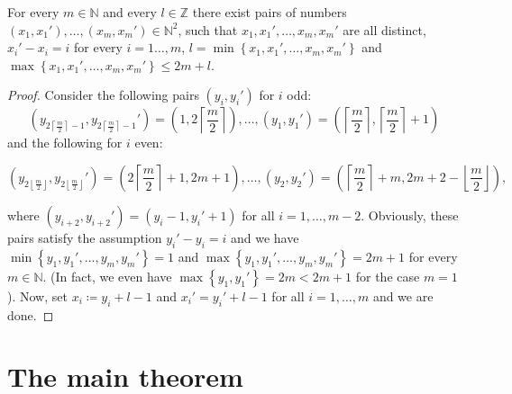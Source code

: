 \begin{lem}\label{lemma15}
For every \(m\in\mathbb{N}\) and every \(l\in\mathbb{Z}\) there exist pairs of numbers\\
\((x_1,x_1'),\ldots,(x_m,x_m')\in\mathbb{N}^2\), such that \(x_1,x_1',\ldots,x_m,x_m'\) are all distinct,\\
\(x_i'-x_i=i\) for every \(i=1\ldots,m\), \(l=\min\left\{x_1,x_1',\ldots,x_m,x_m'\right\}\) and\\
\(\max\left\{x_1,x_1',\ldots,x_m,x_m'\right\}\leq 2m+l\).
\begin{proof}
Consider the following pairs \((y_i,y_i')\) for \(i\) odd:
\[
\left(y_{2\left\lceil\frac{m}{2}\right\rceil-1},y_{2\left\lceil\frac{m}{2}\right\rceil-1}'\right)=\left(1,2\left\lceil\frac{m}{2}\right\rceil\right),\ldots,\left(y_1,y_1'\right)=\left(\left\lceil\frac{m}{2}\right\rceil,\left\lceil\frac{m}{2}\right\rceil+1\right)
\]
and the following for \(i\) even:
\begin{footnotesize}
\[
\left(y_{2\left\lfloor\frac{m}{2}\right\rfloor},y_{2\left\lfloor\frac{m}{2}\right\rfloor}'\right)=\left(2\left\lceil\frac{m}{2}\right\rceil+1,2m+1\right),\ldots,\left(y_2,y_2'\right)=\left(\left\lceil\frac{m}{2}\right\rceil+m,2m+2-\left\lfloor\frac{m}{2}\right\rfloor\right),
\]
\end{footnotesize}
where \((y_{i+2},y_{i+2}')=(y_i-1,y_i'+1)\) for all \(i=1,\ldots,m-2\). Obviously, these pairs satisfy the assumption \(y_i'-y_i=i\) and we have \(\min\left\{y_1,y_1',\ldots,y_m,y_m'\right\}=1\) and \(\max\left\{y_1,y_1',\ldots,y_m,y_m'\right\}=2m+1\) for every \(m\in\mathbb{N}\). (In fact, we even have \(\max\left\{y_1,y_1'\right\}=2m<2m+1\) for the case \(m=1\)). Now, set \(x_i\coloneqq y_i+l-1\) and \(x_i'=y_i'+l-1\) for all \(i=1,\ldots,m\) and we are done.
\end{proof}
\end{lem}

\section{The main theorem}

